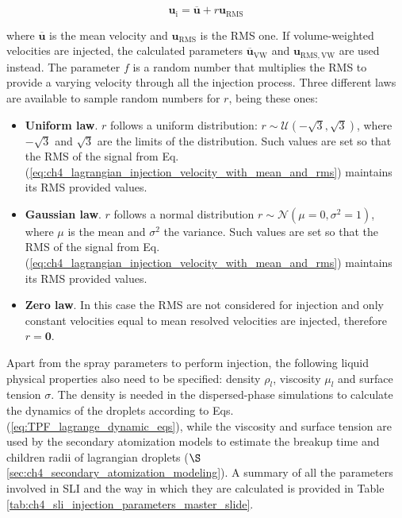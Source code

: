 \begin{itemize}
	
	\begin{equation}	\label{eq:ch4_lagrangian_injection_velocity_with_mean_and_rms}
	\boldsymbol{u}_\mathrm{i} = \overline{\boldsymbol{u}} + r \boldsymbol{u}_\mathrm{RMS}
	\end{equation}
	
	where $\overline{\boldsymbol{u}}$ is the mean velocity and $\boldsymbol{u}_\mathrm{RMS}$ is the RMS one. If volume-weighted velocities are injected, the calculated parameters $\overline{\boldsymbol{u}}_\mathrm{VW}$ and $\boldsymbol{u}_\mathrm{RMS,VW}$ are used instead. The parameter $f$ is a random number that multiplies the RMS to provide a varying velocity through all the injection process. Three different laws are available to sample random numbers for $r$, being these ones:
	
	\begin{itemize}
	
	\item \textbf{Uniform law}. $r$ follows a uniform distribution: $r \sim \mathcal{U} \left(-\sqrt{3},  \sqrt{3} \right)$, where $-\sqrt{3}$ and $\sqrt{3}$ are the limits of the distribution. Such values are set so that the RMS of the signal from Eq. (\ref{eq:ch4_lagrangian_injection_velocity_with_mean_and_rms}) maintains its RMS provided values.
	
	\item \textbf{Gaussian law}. $r$ follows a normal distribution $r \sim \mathcal{N} \left( \mu = 0, \sigma^2 = 1 \right)$, where $\mu$ is the mean and $\sigma^2$ the variance. Such values are set so that the RMS of the signal from Eq. (\ref{eq:ch4_lagrangian_injection_velocity_with_mean_and_rms}) maintains its RMS provided values.
	
	\item \textbf{Zero law}. In this case the RMS are not considered for injection and only constant velocities equal to mean resolved velocities are injected, therefore $r = \textbf{0}$.
	
	\end{itemize}

\end{itemize}

Apart from the spray parameters to perform injection, the following liquid physical properties also need to be specified: density $\rho_l$, viscosity $\mu_l$ and surface tension $\sigma$. The density is needed in the dispersed-phase simulations to calculate the dynamics of the droplets according to Eqs. (\ref{eq:TPF_lagrange_dynamic_eqs}), while the viscosity and surface tension are used by the secondary atomization models to estimate the breakup time and children radii of lagrangian droplets ($\S$\ref{sec:ch4_secondary_atomization_modeling}). A summary of all the parameters involved in SLI and the way in which they are calculated is provided in Table \ref{tab:ch4_sli_injection_parameters_master_slide}.




